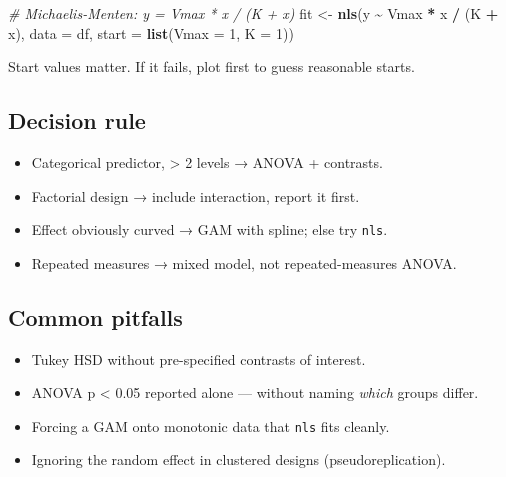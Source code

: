 \documentclass[
]{article}
\newenvironment{Shaded}{\begin{snugshade}}{\end{snugshade}}
\newcommand{\AttributeTok}[1]{\textcolor[rgb]{0.13,0.29,0.53}{#1}}
\newcommand{\CommentTok}[1]{\textcolor[rgb]{0.56,0.35,0.01}{\textit{#1}}}
\newcommand{\DecValTok}[1]{\textcolor[rgb]{0.00,0.00,0.81}{#1}}
\newcommand{\FunctionTok}[1]{\textcolor[rgb]{0.13,0.29,0.53}{\textbf{#1}}}
\newcommand{\NormalTok}[1]{#1}
\newcommand{\OtherTok}[1]{\textcolor[rgb]{0.56,0.35,0.01}{#1}}
\newcommand{\SpecialCharTok}[1]{\textcolor[rgb]{0.81,0.36,0.00}{\textbf{#1}}}
\providecommand{\tightlist}{%
  \setlength{\itemsep}{0pt}\setlength{\parskip}{0pt}}
\begin{document}
\begin{Shaded}
\begin{Highlighting}[]
\CommentTok{\# Michaelis{-}Menten: y = Vmax * x / (K + x)}
\NormalTok{fit }\OtherTok{\textless{}{-}} \FunctionTok{nls}\NormalTok{(y }\SpecialCharTok{\textasciitilde{}}\NormalTok{ Vmax }\SpecialCharTok{*}\NormalTok{ x }\SpecialCharTok{/}\NormalTok{ (K }\SpecialCharTok{+}\NormalTok{ x),}
           \AttributeTok{data =}\NormalTok{ df, }\AttributeTok{start =} \FunctionTok{list}\NormalTok{(}\AttributeTok{Vmax =} \DecValTok{1}\NormalTok{, }\AttributeTok{K =} \DecValTok{1}\NormalTok{))}
\end{Highlighting}
\end{Shaded}

Start values matter. If it fails, plot first to guess reasonable starts.

\subsection{Decision rule}\label{decision-rule-5}

\begin{itemize}
\tightlist
\item
  Categorical predictor, \textgreater{} 2 levels → ANOVA + contrasts.
\item
  Factorial design → include interaction, report it first.
\item
  Effect obviously curved → GAM with spline; else try \texttt{nls}.
\item
  Repeated measures → mixed model, not repeated-measures ANOVA.
\end{itemize}

\subsection{Common pitfalls}\label{common-pitfalls-5}

\begin{itemize}
\tightlist
\item
  Tukey HSD without pre-specified contrasts of interest.
\item
  ANOVA p \textless{} 0.05 reported alone --- without naming
  \emph{which} groups differ.
\item
  Forcing a GAM onto monotonic data that \texttt{nls} fits cleanly.
\item
  Ignoring the random effect in clustered designs (pseudoreplication).
\end{itemize}
\end{document}
